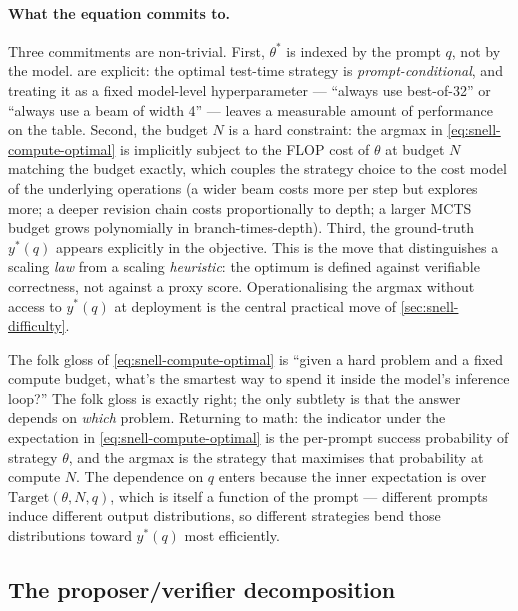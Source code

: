 \paragraph{What the equation commits to.} Three commitments are
non-trivial. First, $\theta^\ast$ is indexed by the prompt $q$, not by
the model. \citet[\S 3.2]{snell2024} are explicit: the optimal
test-time strategy is \emph{prompt-conditional}, and treating it as a
fixed model-level hyperparameter --- ``always use best-of-32'' or
``always use a beam of width 4'' --- leaves a measurable amount of
performance on the table. Second, the budget $N$ is a hard constraint:
the argmax in \cref{eq:snell-compute-optimal} is implicitly subject to
the FLOP cost of $\theta$ at budget $N$ matching the budget exactly,
which couples the strategy choice to the cost model of the underlying
operations (a wider beam costs more per step but explores more; a
deeper revision chain costs proportionally to depth; a larger MCTS
budget grows polynomially in branch-times-depth). Third, the
ground-truth $y^\ast(q)$ appears explicitly in the objective. This is
the move that distinguishes a scaling \emph{law} from a scaling
\emph{heuristic}: the optimum is defined against verifiable
correctness, not against a proxy score. Operationalising the argmax
without access to $y^\ast(q)$ at deployment is the central practical
move of \cref{sec:snell-difficulty}.

\begin{intuition}
The folk gloss of \cref{eq:snell-compute-optimal} is ``given a hard
problem and a fixed compute budget, what's the smartest way to spend it
inside the model's inference loop?'' The folk gloss is exactly right;
the only subtlety is that the answer depends on \emph{which} problem.
Returning to math: the indicator under the expectation in
\cref{eq:snell-compute-optimal} is the per-prompt success probability
of strategy $\theta$, and the argmax is the strategy that maximises that
probability at compute $N$. The dependence on $q$ enters because the
inner expectation is over $\mathrm{Target}(\theta, N, q)$, which is
itself a function of the prompt --- different prompts induce different
output distributions, so different strategies bend those distributions
toward $y^\ast(q)$ most efficiently.
\end{intuition}

\subsection{The proposer/verifier decomposition}
\label{sec:snell-proposer-verifier}

